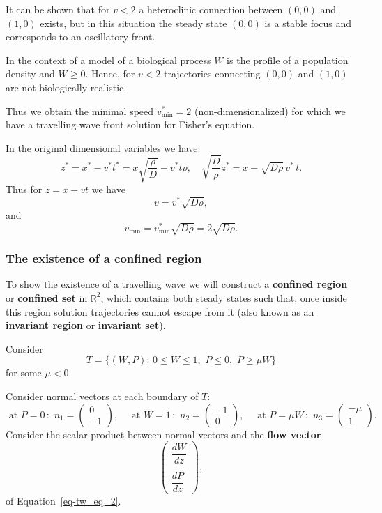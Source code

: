 \documentclass[
  letterpaper,
  DIV=11,
  numbers=noendperiod]{scrreprt}
\theoremstyle{plain}
\theoremstyle{definition}
\theoremstyle{plain}
\theoremstyle{remark}
\begin{document}
It can be shown that for \(v<2\) a heteroclinic connection between
\((0,0)\) and \((1,0)\) exists, but in this situation the steady state
\((0,0)\) is a stable focus and corresponds to an oscillatory front.

In the context of a model of a biological process \(W\) is the profile
of a population density and \(W\geq 0\). Hence, for \(v<2\) trajectories
connecting \((0,0)\) and \((1,0)\) are not biologically realistic.

Thus we obtain the minimal speed \(v^\ast_\text{min}=2\)
(non-dimensionalized) for which we have a travelling wave front solution
for Fisher's equation.

In the original dimensional variables we have: \[
z^\ast= x^\ast - v^\ast t^\ast = x \sqrt{ \frac \rho D} - v^\ast t \rho , \quad 
\sqrt{ \frac D \rho } z^\ast= x  - \sqrt{D \rho}  \, v^\ast\,  t.
\] Thus for \(z = x - vt\) we have \[ 
v=  v^\ast \sqrt{D \rho},
\] and \[
v_{\text{min}}=  v^\ast_{\text{min}} \sqrt{D \rho} = 2  \sqrt{D \rho}.
\]

\hypertarget{the-existence-of-a-confined-region}{%
\subsubsection{The existence of a confined
region}\label{the-existence-of-a-confined-region}}

To show the existence of a travelling wave we will construct a
\textbf{confined region} or \textbf{confined set} in \(\mathbb{R}^2\),
which contains both steady states such that, once inside this region
solution trajectories cannot escape from it (also known as an
\textbf{invariant region} or \textbf{invariant set}).

Consider \[
T= \{ (W,P) : \, 0 \leq W \leq 1,\, \, P \leq 0, \, \,  P \geq \mu W \} 
\] for some \(\mu <0\).

Consider normal vectors at each boundary of \(T\): \[
\text{ at } P = 0 \, : \, \, n_1 = \begin{pmatrix} 
0 \\ -1
\end{pmatrix}, \quad 
\text{ at } W= 1 \, : \, \, n_2 = \begin{pmatrix} 
-1\\ 0
\end{pmatrix}, \quad 
\text{ at } P = \mu W \, : \, \, n_3 = \begin{pmatrix} 
-\mu \\1
\end{pmatrix}.
\] Consider the scalar product between normal vectors and the
\textbf{flow vector} \[
\begin{pmatrix} 
\dfrac{ dW}{dz} \\ \\  \dfrac{dP}{dz}
\end{pmatrix},
\] of Equation~\ref{eq-tw_eq_2}.
\end{document}
